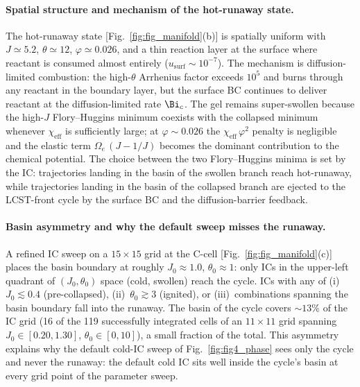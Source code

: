\paragraph{Spatial structure and mechanism of the hot-runaway state.}
The hot-runaway state [Fig.~\ref{fig:fig_manifold}(b)] is spatially
uniform with $J\!\simeq\!5.2$, $\theta\!\simeq\!12$,
$\varphi\!\simeq\!0.026$, and a thin reaction layer at the surface
where reactant is consumed almost entirely
($u_\mathrm{surf}\!\sim\!10^{-7}$).  The mechanism is diffusion-
limited combustion: the high-$\theta$ Arrhenius factor exceeds
$10^5$ and burns through any reactant in the boundary layer, but the
surface BC continues to deliver reactant at the diffusion-limited
rate $\Bi_c$.  The gel remains super-swollen because the high-$J$
Flory--Huggins minimum coexists with the collapsed minimum whenever
$\chi_\mathrm{eff}$ is sufficiently large; at $\varphi\!\sim\!0.026$
the $\chi_\mathrm{eff}\,\varphi^2$ penalty is negligible and the
elastic term $\Omega_e\,(J-1/J)$ becomes the dominant contribution to
the chemical potential.  The choice between the two
Flory--Huggins minima is set by the IC: trajectories landing in the
basin of the swollen branch reach hot-runaway, while trajectories
landing in the basin of the collapsed branch are ejected to the
LCST-front cycle by the surface BC and the diffusion-barrier
feedback.

\paragraph{Basin asymmetry and why the default sweep misses the
runaway.}
A refined IC sweep on a $15\times 15$ grid at the C-cell
[Fig.~\ref{fig:fig_manifold}(c)] places the basin boundary at
roughly $J_0\!\approx\!1.0$, $\theta_0\!\approx\!1$: only ICs in the
upper-left quadrant of $(J_0, \theta_0)$ space (cold, swollen) reach
the cycle.  ICs with any of (i)~$J_0\!\lesssim\!0.4$ (pre-collapsed),
(ii)~$\theta_0\!\gtrsim\!3$ (ignited), or (iii)~combinations
spanning the basin boundary fall into the runaway.  The basin of
the cycle covers
$\sim\!13\%$ of the IC grid (16 of the 119 successfully integrated
cells of an $11{\times}11$ grid spanning $J_0\in[0.20,1.30]$,
$\theta_0\in[0,10]$), a small fraction of the total. This asymmetry explains why the default
cold-IC sweep of Fig.~\ref{fig:fig4_phase} sees only the cycle and
never the runaway: the default cold IC sits well inside the cycle's
basin at every grid point of the parameter sweep.

